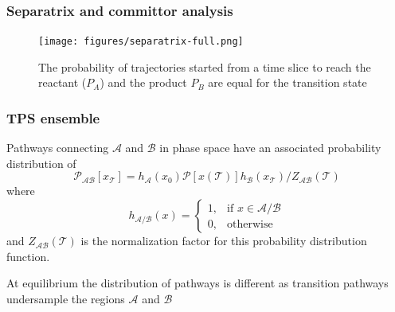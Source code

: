 \documentclass{beamer}
\begin{document}
\begin{frame}
\frametitle{Separatrix and committor analysis}
\begin{figure}
\centering 
\texttt{[image: figures/separatrix-full.png]}
\caption{The probability of trajectories started from a time slice to reach the reactant ($P_A$) and the product $P_B$
are equal for the transition state}
\end{figure}
\end{frame}
\begin{frame}
\frametitle{TPS ensemble}
Pathways connecting $\mathcal{A}$ and $\mathcal{B}$ in phase space have an associated probability distribution of
\begin{equation}
\mathcal{P}_{\mathcal{AB}}[x_{\mathcal{T}}] = h_{\mathcal{A}}(x_0)\mathcal{P}[x(\mathcal{T})]
h_{\mathcal{B}}(x_{\mathcal{T}})/Z_{\mathcal{AB}}(\mathcal{T})\label{eqn:tpsensem}\nonumber 
\end{equation}
where 
\[
    h_{\mathcal{A}/\mathcal{B}}(x)= 
\begin{cases}
    1, & \text{if } x\in \mathcal{A}/\mathcal{B}\\
    0,              & \text{otherwise}
\end{cases}
\]
and $Z_{\mathcal{AB}}(\mathcal{T})$ is the normalization factor for this 
probability distribution function.
\begin{block}{}
At equilibrium the distribution of pathways is different as transition pathways undersample the 
regions $\mathcal{A}$ and $\mathcal{B}$
\end{block}
\end{frame}
%
\end{document}
